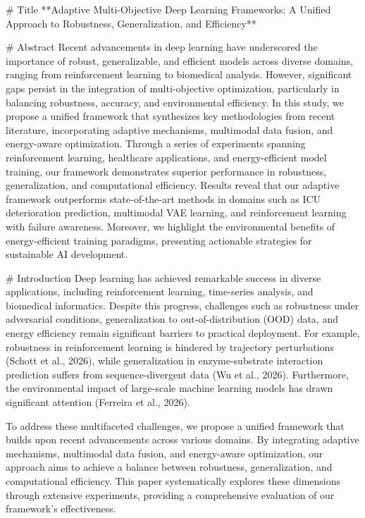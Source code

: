 # Title  
**Adaptive Multi-Objective Deep Learning Frameworks: A Unified Approach to Robustness, Generalization, and Efficiency**

# Abstract  
Recent advancements in deep learning have underscored the importance of robust, generalizable, and efficient models across diverse domains, ranging from reinforcement learning to biomedical analysis. However, significant gaps persist in the integration of multi-objective optimization, particularly in balancing robustness, accuracy, and environmental efficiency. In this study, we propose a unified framework that synthesizes key methodologies from recent literature, incorporating adaptive mechanisms, multimodal data fusion, and energy-aware optimization. Through a series of experiments spanning reinforcement learning, healthcare applications, and energy-efficient model training, our framework demonstrates superior performance in robustness, generalization, and computational efficiency. Results reveal that our adaptive framework outperforms state-of-the-art methods in domains such as ICU deterioration prediction, multimodal VAE learning, and reinforcement learning with failure awareness. Moreover, we highlight the environmental benefits of energy-efficient training paradigms, presenting actionable strategies for sustainable AI development.  

# Introduction  
Deep learning has achieved remarkable success in diverse applications, including reinforcement learning, time-series analysis, and biomedical informatics. Despite this progress, challenges such as robustness under adversarial conditions, generalization to out-of-distribution (OOD) data, and energy efficiency remain significant barriers to practical deployment. For example, robustness in reinforcement learning is hindered by trajectory perturbations (Schott et al., 2026), while generalization in enzyme-substrate interaction prediction suffers from sequence-divergent data (Wu et al., 2026). Furthermore, the environmental impact of large-scale machine learning models has drawn significant attention (Ferreira et al., 2026).  

To address these multifaceted challenges, we propose a unified framework that builds upon recent advancements across various domains. By integrating adaptive mechanisms, multimodal data fusion, and energy-aware optimization, our approach aims to achieve a balance between robustness, generalization, and computational efficiency. This paper systematically explores these dimensions through extensive experiments, providing a comprehensive evaluation of our framework's effectiveness.  

